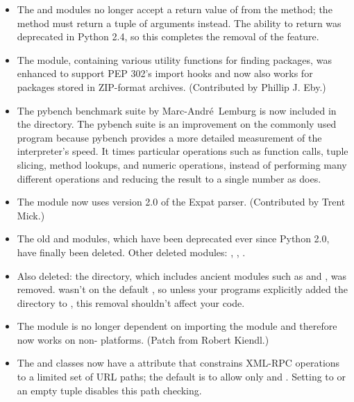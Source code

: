 \documentclass{howto}
\begin{document}
\begin{itemize}
\item The  and  modules no
longer accept a return value of  from the
 method; the method must return a tuple of
arguments instead.  The ability to return  was deprecated
in Python 2.4, so this completes the removal of the feature.

\item The  module, containing various utility
functions for finding packages, was enhanced to support PEP 302's
import hooks and now also works for packages stored in ZIP-format archives.
(Contributed by Phillip J. Eby.)

\item The pybench benchmark suite by Marc-Andr\'e~Lemburg is now
included in the  directory.  The pybench suite is
an improvement on the commonly used  program because
pybench provides a more detailed measurement of the interpreter's
speed.  It times particular operations such as function calls,
tuple slicing, method lookups, and numeric operations, instead of
performing many different operations and reducing the result to a
single number as  does.

\item The  module now uses version 2.0 of the Expat parser.
(Contributed by Trent Mick.)

\item The old  and  modules, which have been 
deprecated ever since Python 2.0, have finally been deleted.  
Other deleted modules: , ,
.

\item Also deleted: the  directory,
which includes ancient modules such as  and
, was removed.   wasn't on the default
, so unless your programs explicitly added the directory to 
, this removal shouldn't affect your code.

\item The  module is no longer 
dependent on importing the  module and
therefore now works on non-{\UNIX} platforms.
(Patch from Robert Kiendl.)

\item The  and  
classes now have a  attribute that constrains
XML-RPC operations to a limited set of URL paths; the default is
to allow only  and .  Setting 
 to  or an empty tuple disables 
this path checking.


\end{itemize}
\end{document}

